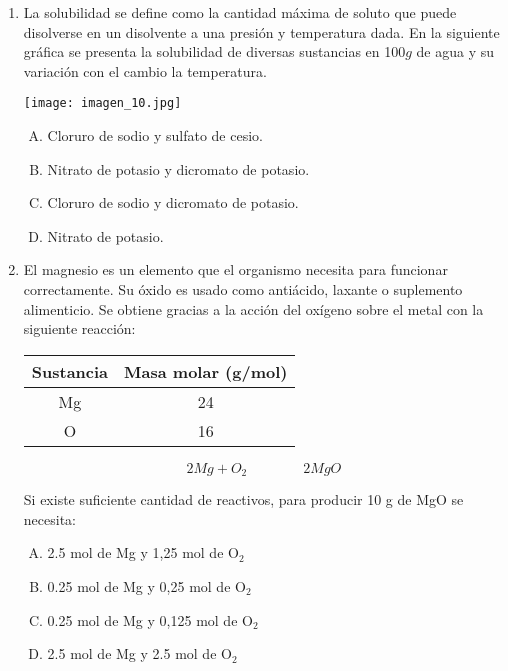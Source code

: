\begin{enumerate}
\newpage
\item La solubilidad se define como la cantidad máxima de soluto que puede disolverse en un disolvente a una presión y temperatura dada. En la siguiente gráfica se presenta la solubilidad de diversas sustancias en 100$g$ de agua y su variación con el cambio la temperatura. \label{mon-13}
\begin{center}
\texttt{[image: imagen\_10.jpg]}
\end{center}
\begin{enumerate}[(A)]
\item Cloruro de sodio y sulfato de cesio.
\item Nitrato de potasio y dicromato de potasio.
\item Cloruro de sodio y dicromato de potasio.
\item Nitrato de potasio.
\end{enumerate}


\item El magnesio es un elemento que el organismo necesita para funcionar correctamente. Su óxido es usado como antiácido, laxante o suplemento alimenticio. Se obtiene gracias a la acción del oxígeno sobre el metal con la siguiente reacción: \label{mon-14}
\begin{center}
\begin{tabular}{|cc|}
\hline 
Sustancia & Masa molar (g/mol) \\
\hline 
Mg & 24\\
O & 16 \\
\hline 
\end{tabular} 
\end{center}
\begin{equation*}
2Mg + O_2   \qquad \qquad        2 MgO   
\end{equation*}

Si existe suficiente cantidad de reactivos, para producir 10 g de MgO se necesita:

\begin{enumerate}[(A)]
\item 2.5 mol de Mg y 1,25 mol de O$_2$
\item 0.25 mol de Mg y 0,25 mol de O$_2$
\item 0.25 mol de Mg y 0,125 mol de O$_2$
\item 2.5 mol de Mg y 2.5 mol de O$_2$
\end{enumerate}


\end{enumerate}
